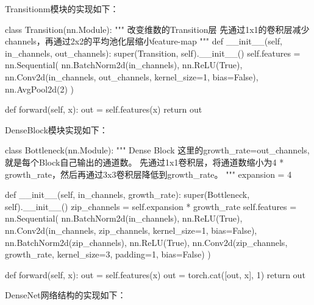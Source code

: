 \documentclass[UTF8,a4paper,10pt]{ctexart}
\begin{document}
Transitionm模块的实现如下：

\begin{python}
class Transition(nn.Module):
    """
    改变维数的Transition层
    先通过1x1的卷积层减少channels，再通过2x2的平均池化层缩小feature-map
    """
    def __init__(self, in_channels, out_channels):
        super(Transition, self).__init__()
        self.features = nn.Sequential(
            nn.BatchNorm2d(in_channels),
            nn.ReLU(True),
            nn.Conv2d(in_channels, out_channels, kernel_size=1, bias=False),
            nn.AvgPool2d(2)
        )
        
    def forward(self, x):
        out = self.features(x)
        return out
\end{python}

DenseBlock模块实现如下：

\begin{python}
class Bottleneck(nn.Module):
    """
    Dense Block
    这里的growth_rate=out_channels, 就是每个Block自己输出的通道数。
    先通过1x1卷积层，将通道数缩小为4 * growth_rate，然后再通过3x3卷积层降低到growth_rate。
    """
    expansion = 4
    
    def __init__(self, in_channels, growth_rate):
        super(Bottleneck, self).__init__()
        zip_channels = self.expansion * growth_rate
        self.features = nn.Sequential(
            nn.BatchNorm2d(in_channels),
            nn.ReLU(True),
            nn.Conv2d(in_channels, zip_channels, kernel_size=1, bias=False),
            nn.BatchNorm2d(zip_channels),
            nn.ReLU(True),
            nn.Conv2d(zip_channels, growth_rate, kernel_size=3, padding=1, bias=False)
        )
        
    def forward(self, x):
        out = self.features(x)
        out = torch.cat([out, x], 1)
        return out
\end{python}

DenseNet网络结构的实现如下：
\end{document}
